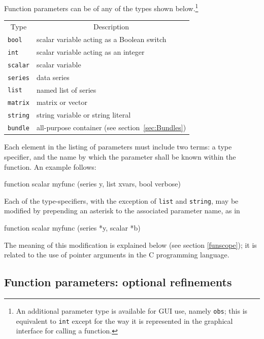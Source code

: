 Function parameters can be of any of the types shown
below.\footnote{An additional parameter type is available for GUI use,
  namely \texttt{obs}; this is equivalent to \texttt{int} except for
  the way it is represented in the graphical interface for calling a
  function.}

\begin{center}
\begin{tabular}{ll}
\multicolumn{1}{c}{Type} & 
\multicolumn{1}{c}{Description} \\ [4pt]
\texttt{bool}   & scalar variable acting as a Boolean switch \\
\texttt{int}    & scalar variable acting as an integer  \\
\texttt{scalar} & scalar variable \\
\texttt{series} & data series \\
\texttt{list}   & named list of series \\
\texttt{matrix} & matrix or vector \\
\texttt{string} & string variable or string literal \\
\texttt{bundle} & all-purpose container (see section~\ref{sec:Bundles})
\end{tabular}
\end{center}

Each element in the listing of parameters must include two terms: a
type specifier, and the name by which the parameter shall be known
within the function.  An example follows:
%    
\begin{code}
function scalar myfunc (series y, list xvars, bool verbose)
\end{code}

Each of the type-specifiers, with the exception of \texttt{list} and
\texttt{string}, may be modified by prepending an asterisk to the
associated parameter name, as in
%    
\begin{code}
function scalar myfunc (series *y, scalar *b)
\end{code}

The meaning of this modification is explained below (see section
\ref{funscope}); it is related to the use of pointer arguments in the
C programming language.

\subsection{Function parameters: optional refinements}

